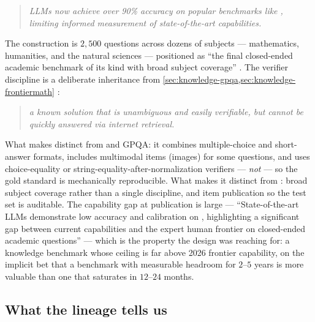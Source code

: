 \begin{quote}\itshape
LLMs now achieve over 90\% accuracy on popular benchmarks like ,
limiting informed measurement of state-of-the-art  capabilities.
\end{quote}

The construction is $2{,}500$ questions across dozens of subjects ---
mathematics, humanities, and the natural sciences ---
positioned as ``the final closed-ended academic benchmark of its kind
with broad subject coverage'' \citep[\S{}abstract]{phan2025-hle}. The
verifier discipline is a deliberate inheritance from
\cref{sec:knowledge-gpqa,sec:knowledge-frontiermath}
\citep[\S{}sec-format]{phan2025-hle}:

\begin{quote}\itshape
a known solution that is unambiguous and easily verifiable, but cannot
be quickly answered via internet retrieval.
\end{quote}

What makes  distinct from  and GPQA: it combines multiple-choice
and short-answer formats, includes multimodal items (images) for some
questions, and uses choice-equality or string-equality-after-normalization
verifiers --- \emph{not}  --- so the gold standard is
mechanically reproducible. What makes it distinct from :
broad subject coverage rather than a single discipline, and item
publication so the test set is auditable. The capability gap at
publication is large --- ``State-of-the-art LLMs demonstrate low
accuracy and calibration on , highlighting a significant gap between
current  capabilities and the expert human frontier on closed-ended
academic questions'' \citep[\S{}sec-capability-gap]{phan2025-hle} ---
which is the property the design was reaching for: a knowledge
benchmark whose ceiling is far above 2026 frontier capability, on the
implicit bet that a benchmark with measurable headroom for $2$--$5$ years
is more valuable than one that saturates in $12$--$24$ months.

\subsection{What the lineage tells us}
\label{sec:knowledge-summary}

